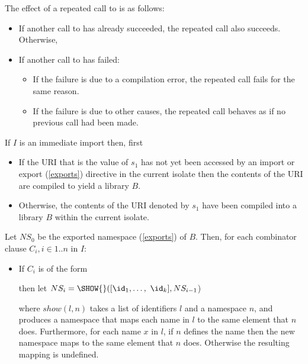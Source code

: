 \documentclass[makeidx]{article}
\begin{document}
{\LMHash{}%
The effect of a repeated call to  is as follows:
\begin{itemize}
\item
If another call to  has already succeeded, the repeated call also succeeds.
Otherwise,
\item
If another call to  has failed:
\begin{itemize}
\item
If the failure is due to a compilation error, the repeated call fails for the same reason.
\item
If the failure is due to other causes, the repeated call behaves as if no previous call had been made.
\end{itemize}
\end{itemize}


\LMHash{}%
If $I$ is an immediate import then, first

\begin{itemize}
\item
If the URI that is the value of $s_1$ has not yet been accessed by an import or export (\ref{exports}) directive in the current isolate then the contents of the URI are compiled to yield a library $B$.
\item Otherwise, the contents of the URI denoted by $s_1$ have been compiled into a library $B$ within the current isolate.
\end{itemize}

\LMHash{}%
Let $NS_0$ be the exported namespace (\ref{exports}) of $B$.
Then, for each combinator clause $C_i, i \in 1 .. n$ in $I$:
\begin{itemize}
\item If $C_i$ is of the form


then let $NS_i = \SHOW{}([\id_1, \ldots,\ \id_k], NS_{i-1}$)

where $show(l,n)$ takes a list of identifiers $l$ and a namespace $n$, and produces a namespace that maps each name in $l$ to the same element that $n$ does.
Furthermore, for each name $x$ in $l$, if $n$ defines the name  then the new namespace maps  to the same element that $n$ does.
Otherwise the resulting mapping is undefined.


\end{itemize}}
\end{document}
